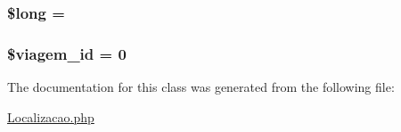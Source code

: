 \subsubsection[{\$long}]{\setlength{\rightskip}{0pt plus 5cm}\$long = \textquotesingle{}\textquotesingle{}}\label{class_localizacao_a30223182013e2964ccbd7c134b3c52c1}
\hypertarget{class_localizacao_ab312bd69638ac149afd702469afbee71}{}
\subsubsection[{\$viagem\+\_\+id}]{\setlength{\rightskip}{0pt plus 5cm}\$viagem\+\_\+id = 0}\label{class_localizacao_ab312bd69638ac149afd702469afbee71}


The documentation for this class was generated from the following file\+:\begin{DoxyCompactItemize}
\item 
\hyperlink{_localizacao_8php}{Localizacao.\+php}\end{DoxyCompactItemize}
